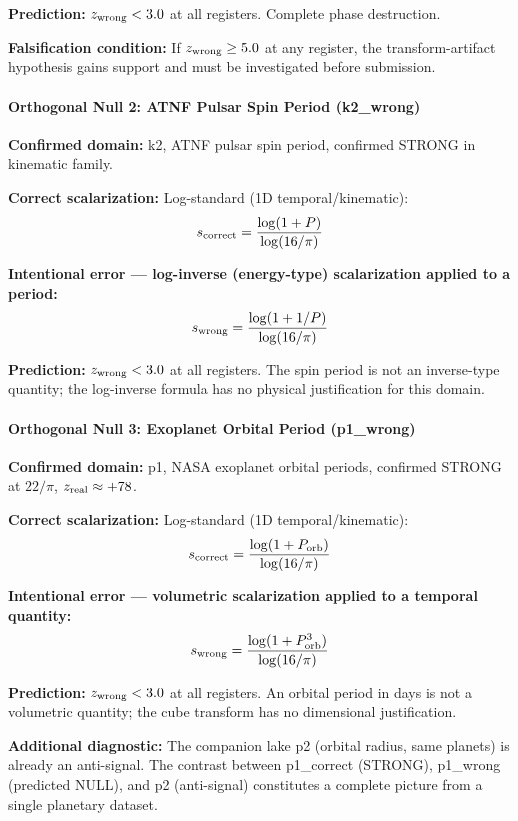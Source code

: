 \documentclass[12pt,a4paper]{article}
\begin{document}
\textbf{Prediction:} $z_{\rm wrong} < 3.0$ at all registers. Complete phase
destruction.

\textbf{Falsification condition:} If $z_{\rm wrong} \geq 5.0$ at any register,
the transform-artifact hypothesis gains support and must be investigated before
submission.
\vspace{0.5em}

\paragraph{Orthogonal Null 2: ATNF Pulsar Spin Period (k2\_wrong)}

\textbf{Confirmed domain:} k2, ATNF pulsar spin period, confirmed STRONG in
kinematic family.

\textbf{Correct scalarization:} Log-standard (1D temporal/kinematic):
\[
  s_{\rm correct} = \frac{\log(1 + P)}{\log(16/\pi)}
\]

\textbf{Intentional error --- log-inverse (energy-type) scalarization applied
to a period:}
\[
  s_{\rm wrong} = \frac{\log(1 + 1/P)}{\log(16/\pi)}
\]

\textbf{Prediction:} $z_{\rm wrong} < 3.0$ at all registers. The spin period is
not an inverse-type quantity; the log-inverse formula has no physical
justification for this domain.
\vspace{0.5em}

\paragraph{Orthogonal Null 3: Exoplanet Orbital Period (p1\_wrong)}

\textbf{Confirmed domain:} p1, NASA exoplanet orbital periods, confirmed STRONG
at $22/\pi$, $z_{\rm real} \approx +78$.

\textbf{Correct scalarization:} Log-standard (1D temporal/kinematic):
\[
  s_{\rm correct} = \frac{\log(1 + P_{\rm orb})}{\log(16/\pi)}
\]

\textbf{Intentional error --- volumetric scalarization applied to a temporal
quantity:}
\[
  s_{\rm wrong} = \frac{\log(1 + P_{\rm orb}^3)}{\log(16/\pi)}
\]

\textbf{Prediction:} $z_{\rm wrong} < 3.0$ at all registers. An orbital period
in days is not a volumetric quantity; the cube transform has no dimensional
justification.

\textbf{Additional diagnostic:} The companion lake p2 (orbital radius, same
planets) is already an anti-signal. The contrast between p1\_correct (STRONG),
p1\_wrong (predicted NULL), and p2 (anti-signal) constitutes a complete
picture from a single planetary dataset.
\vspace{0.5em}
\end{document}
